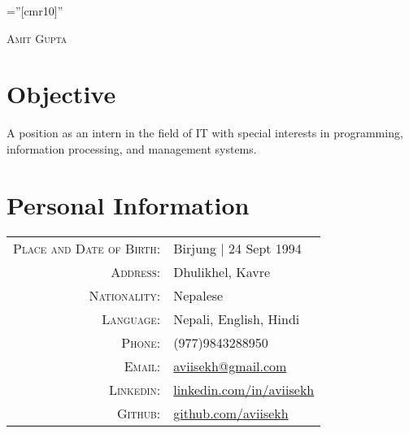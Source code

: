 \documentclass[a4paper,10pt]{article}
\begin{document}

\pagestyle{empty} %

\font\fb=''[cmr10]'' %

\par{\centering
		{\huge \textsc{Amit Gupta}
	}\bigskip\par}

\section{Objective}
A position as an intern in the field of IT with special interests in programming, information processing, and management systems.

\section{Personal Information}

\begin{tabular}{rl}
    \textsc{Place and Date of Birth:} & Birjung  | 24 Sept 1994 \\
    \textsc{Address:}   & Dhulikhel, Kavre \\
    \textsc{Nationality:} & Nepalese\\
    \textsc{Language:} & Nepali, English, Hindi\\
    \textsc{Phone:}     & (977)9843288950\\
    \textsc{Email:}     & \href{mailto:aviisekh@gmail.com}{aviisekh@gmail.com}\\
    \textsc{Linkedin:} & \href{https://www.linkedin.com/in/aviisekh}{linkedin.com/in/aviisekh}\\
    \textsc{Github:} & \href{https://www.github.com/aviisekh}{github.com/aviisekh}\\
\end{tabular}

\end{document}
